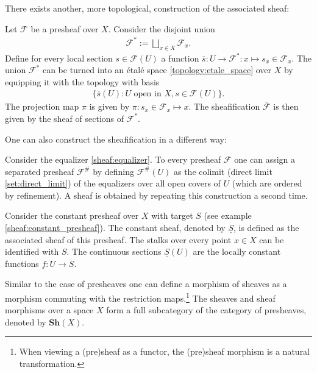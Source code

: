     There exists another, more topological, construction of the associated sheaf:
    \begin{construct}\label{sheaf:etale_construction}
        Let $\mathcal{F}$ be a presheaf over $X$. Consider the disjoint union
        \begin{gather}
            \mathcal{F}^* := \bigsqcup_{x\in X}\mathcal{F}_x.
        \end{gather}
        Define for every local section $s\in\mathcal{F}(U)$ a function $\overline{s}:U\rightarrow\mathcal{F}^*:x\mapsto s_x\in\mathcal{F}_x$. The union $\mathcal{F}^*$ can be turned into an \'etal\'e space \ref{topology:etale_space} over $X$ by equipping it with the topology with basis
        \begin{gather}
            \big\{\overline{s}(U):U\text{ open in }X, s\in\mathcal{F}(U)\big\}.
        \end{gather}
        The projection map $\pi$ is given by $\pi:s_x\in\mathcal{F}_x\mapsto x$. The sheafification $\overline{\mathcal{F}}$ is then given by the sheaf of sections of $\mathcal{F}^*$.
    \end{construct}

    One can also construct the sheafification in a different way:
    \begin{construct}\label{sheaf:colimit_construction}
        Consider the equalizer \ref{sheaf:equalizer}. To every presheaf $\mathcal{F}$ one can assign a separated presheaf $\mathcal{F}^\#$ by defining $\mathcal{F}^\#(U)$ as the colimit (direct limit \ref{set:direct_limit}) of the equalizers over all open covers of $U$ (which are ordered by refinement). A sheaf is obtained by repeating this construction a second time.
    \end{construct}

    \begin{example}\label{sheaf:constant_sheaf}
        Consider the constant presheaf over $X$ with target $S$ (see example \ref{sheaf:constant_presheaf}). The constant sheaf, denoted by $\underline{S}$, is defined as the associated sheaf of this presheaf. The stalks over every point $x\in X$ can be identified with $S$. The continuous sections $\underline{S}(U)$ are the locally constant functions $f:U\rightarrow S$.
    \end{example}

    \begin{notation}
        Similar to the case of presheaves one can define a morphism of sheaves as a morphism commuting with the restriction maps.\footnote{When viewing a (pre)sheaf as a functor, the (pre)sheaf morphism is a natural transformation.} The sheaves and sheaf morphisms over a space $X$ form a full subcategory of the category of presheaves, denoted by $\mathbf{Sh}(X)$.
    \end{notation}

